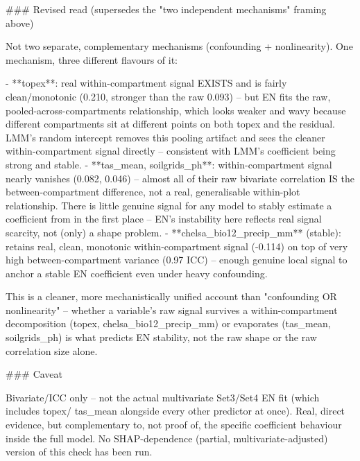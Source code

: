 ### Revised read (supersedes the "two independent mechanisms" framing above)

Not two separate, complementary mechanisms (confounding + nonlinearity). One mechanism, three
different flavours of it:

- **topex**: real within-compartment signal EXISTS and is fairly clean/monotonic (0.210,
  stronger than the raw 0.093) -- but EN fits the raw, pooled-across-compartments relationship,
  which looks weaker and wavy because different compartments sit at different points on both
  topex and the residual. LMM's random intercept removes this pooling artifact and sees the
  cleaner within-compartment signal directly -- consistent with LMM's coefficient being strong
  and stable.
- **tas_mean, soilgrids_ph**: within-compartment signal nearly vanishes (0.082, 0.046) --
  almost all of their raw bivariate correlation IS the between-compartment difference, not a
  real, generalisable within-plot relationship. There is little genuine signal for any model to
  stably estimate a coefficient from in the first place -- EN's instability here reflects real
  signal scarcity, not (only) a shape problem.
- **chelsa_bio12_precip_mm** (stable): retains real, clean, monotonic within-compartment signal
  (-0.114) on top of very high between-compartment variance (0.97 ICC) -- enough genuine local
  signal to anchor a stable EN coefficient even under heavy confounding.

This is a cleaner, more mechanistically unified account than "confounding OR nonlinearity" --
whether a variable's raw signal survives a within-compartment decomposition (topex,
chelsa_bio12_precip_mm) or evaporates (tas_mean, soilgrids_ph) is what predicts EN stability,
not the raw shape or the raw correlation size alone.

### Caveat

Bivariate/ICC only -- not the actual multivariate Set3/Set4 EN fit (which includes topex/
tas_mean alongside every other predictor at once). Real, direct evidence, but complementary to,
not proof of, the specific coefficient behaviour inside the full model. No SHAP-dependence
(partial, multivariate-adjusted) version of this check has been run.
